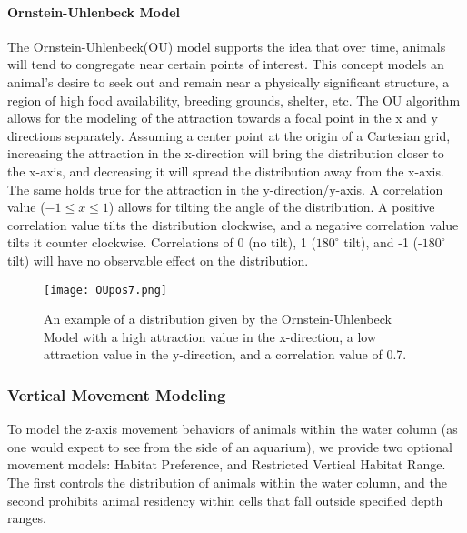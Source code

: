 \paragraph{Ornstein-Uhlenbeck Model}
\label{ouModel}
The Ornstein-Uhlenbeck(OU) model\cite{OU} supports the idea that over time, animals will tend to congregate near certain points of interest.  This concept models an animal's desire to seek out and remain near a physically significant structure, a region of high food availability, breeding grounds, shelter, etc.  The OU algorithm allows for the modeling of the attraction towards a focal point in the x and y directions separately.  Assuming a center point at the origin of a Cartesian grid, increasing the attraction in the x-direction will bring the distribution closer to the x-axis, and decreasing it will spread the distribution away from the x-axis.  The same holds true for the attraction in the y-direction/y-axis.  A correlation value ($-1\le x \le 1$) allows for tilting the angle of the distribution.  A positive correlation value tilts the distribution clockwise, and a negative correlation value tilts it counter clockwise.  Correlations of 0 (no tilt), 1 ($180^{\circ}$ tilt), and -1 (-$180^{\circ}$ tilt) will have no observable effect on the distribution.


\begin{figure}[ht]
	\label{OUimg}
	\centering
	\texttt{[image: OUpos7.png]}
	\caption{An example of a distribution given by the Ornstein-Uhlenbeck Model with a high attraction value in the x-direction, a low attraction value in the y-direction, and a correlation value of 0.7.}
\end{figure}


\subsubsection{Vertical Movement Modeling}
\label{verticalMovement}
To model the z-axis movement behaviors of animals within the water column (as one would expect to see from the side of an aquarium), we provide two optional movement models: Habitat Preference, and Restricted Vertical Habitat Range.  The first controls the distribution of animals within the water column, and the second prohibits animal residency within cells that fall outside specified depth ranges. 

